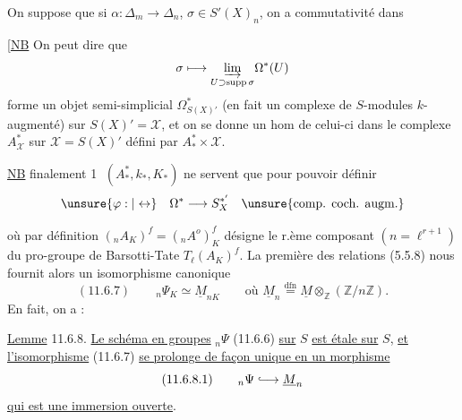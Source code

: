 On suppose que si $\alpha:\Delta_m\longrightarrow\Delta_n$,
$\sigma\in S'(X)_n$,
on a commutativité dans

[\uline{NB} On peut dire que
\[
\sigma\longmapsto\underset{U\supset\operatorname{supp}\sigma}{\varinjlim}\Omega^*(U)
\]
forme un  objet semi-simplicial
$\Omega^*_{S(X)'}$ (en fait un complexe de $S$-modules
$k$-augmenté) sur $S(X)'=\mathcal X$,
et on se donne un hom de celui-ci dans le complexe 
$A^*_{\mathcal X}$ sur $\mathcal X=S(X)'$ défini par
$A_*^*\times\mathcal X$.


\uline{NB} finalement \textcircled{1} $(A_*^*,k_*,K_*)$
 ne servent que pour pouvoir définir
\[
\unsure{\varphi:|\leftrightarrow}\quad\Omega^*\longrightarrow S_X^{*'}
\quad\unsure{\text{comp. coch. augm.}}
\]


où par définition $({}_n A_K)^f=({}_n A^o)_K^f$ désigne le r.ème composant $(n=\ell^{r+1})$ du pro-groupe de Barsotti-Tate $T_\ell(A_K)^f$. La première des relations (5.5.8) nous fournit alors un isomorphisme canonique
\[
(11.6.7)\qquad {}_n\Psi_K\simeq\underline M_{nK}
\qquad\text{où }\underline M_n\overset{\mathrm{dfn}}=
\underline M\otimes_{\mathbb Z}(\mathbb Z/n\mathbb Z).
\]
En fait, on a :

\uline{Lemme} 11.6.8. \uline{Le schéma en groupes} $ {}_n\Psi$ (11.6.6) \uline{sur} $S$ \uline{est étale sur} $S$, \uline{et l'isomorphisme} (11.6.7) \uline{se prolonge de façon unique en un morphisme}
\[
(11.6.8.1)\qquad {}_n\Psi\lhook\joinrel\longrightarrow\underline M_n
\]
\uline{qui est une immersion ouverte}.

